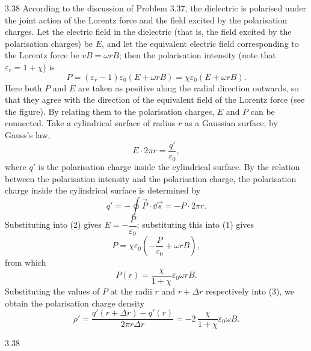 \begin{solution}{3.38}
According to the discussion of Problem 3.37, the dielectric is polarised under the joint action of the Lorentz force and the field excited by the polarisation charges. Let the electric field in the dielectric (that is, the field excited by the polarisation charges) be $E$, and let the equivalent electric field corresponding to the Lorentz force be $vB=\omega rB$; then the polarisation intensity (note that $\varepsilon_r=1+\chi$) is
\begin{equation}
P=(\varepsilon_r-1)\varepsilon_0\left(E+\omega rB\right)=\chi\varepsilon_0\left(E+\omega rB\right). \tag{1}
\end{equation}
Here both $P$ and $E$ are taken as positive along the radial direction outwards, so that they agree with the direction of the equivalent field of the Lorentz force (see the figure). By relating them to the polarisation charges, $E$ and $P$ can be connected. Take a cylindrical surface of radius $r$ as a Gaussian surface; by Gauss's law,
\begin{equation}
E\cdot2\pi r=\frac{q'}{\varepsilon_0}, \tag{2}
\end{equation}
where $q'$ is the polarisation charge inside the cylindrical surface. By the relation between the polarisation intensity and the polarisation charge, the polarisation charge inside the cylindrical surface is determined by
\begin{equation}
q'=-\oint\vec{P}\cdot\dd\vec{s}=-P\cdot2\pi r. \tag{3}
\end{equation}
Substituting into (2) gives $E=-\dfrac{P}{\varepsilon_0}$; substituting this into (1) gives
\[
P=\chi\varepsilon_0\left(-\frac{P}{\varepsilon_0}+\omega rB\right),
\]
from which
\begin{equation}
P(r)=\frac{\chi}{1+\chi}\varepsilon_0\omega rB. \tag{4}
\end{equation}
Substituting the values of $P$ at the radii $r$ and $r+\Delta r$ respectively into (3), we obtain the polarisation charge density
\begin{equation}
\rho'=\frac{q'(r+\Delta r)-q'(r)}{2\pi r\Delta r}
=-2\,\frac{\chi}{1+\chi}\varepsilon_0\omega B. \tag{5}
\end{equation}

\begin{figbox}{3.38}
\end{figbox}


\end{solution}
